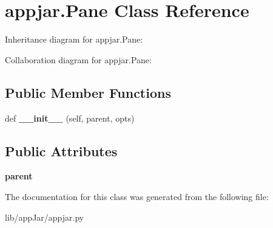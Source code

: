 \hypertarget{classappjar_1_1_pane}{}\section{appjar.\+Pane Class Reference}
\label{classappjar_1_1_pane}


Inheritance diagram for appjar.\+Pane\+:


Collaboration diagram for appjar.\+Pane\+:
\subsection*{Public Member Functions}
\begin{DoxyCompactItemize}
\item 
\mbox{\label{classappjar_1_1_pane_a614632e01b91c402ce3c4207f55934ba}} 
def {\bfseries \+\_\+\+\_\+init\+\_\+\+\_\+} (self, parent, opts)
\end{DoxyCompactItemize}
\subsection*{Public Attributes}
\begin{DoxyCompactItemize}
\item 
\mbox{\label{classappjar_1_1_pane_adbf3368b17984f6efb468b42e13171b4}} 
{\bfseries parent}
\end{DoxyCompactItemize}


The documentation for this class was generated from the following file\+:\begin{DoxyCompactItemize}
\item 
lib/app\+Jar/appjar.\+py\end{DoxyCompactItemize}
